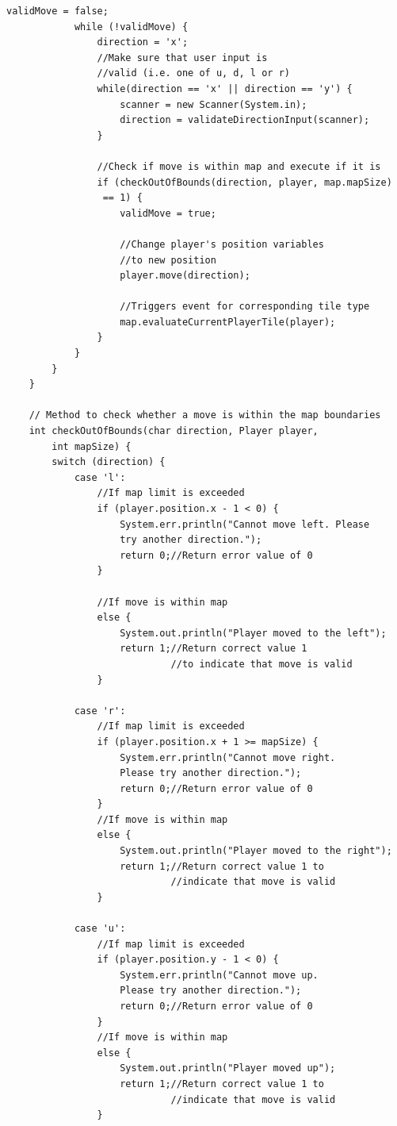 \documentclass[a4paper,12pt]{extarticle}
\begin{document}
\begin{lstlisting}[caption=The initial code of the Game class, label=amb]
            validMove = false;
            while (!validMove) {
                direction = 'x';
                //Make sure that user input is
                //valid (i.e. one of u, d, l or r)
                while(direction == 'x' || direction == 'y') {
                    scanner = new Scanner(System.in);
                    direction = validateDirectionInput(scanner);
                }

                //Check if move is within map and execute if it is
                if (checkOutOfBounds(direction, player, map.mapSize)
                 == 1) {
                    validMove = true;

                    //Change player's position variables 
                    //to new position
                    player.move(direction);

                    //Triggers event for corresponding tile type
                    map.evaluateCurrentPlayerTile(player);
                }
            }
        }
    }

    // Method to check whether a move is within the map boundaries
    int checkOutOfBounds(char direction, Player player, 
    	int mapSize) {
        switch (direction) {
            case 'l':
                //If map limit is exceeded
                if (player.position.x - 1 < 0) {
                    System.err.println("Cannot move left. Please 
                    try another direction.");
                    return 0;//Return error value of 0
                }

                //If move is within map
                else {
                    System.out.println("Player moved to the left");
                    return 1;//Return correct value 1
                    	     //to indicate that move is valid
                }

            case 'r':
                //If map limit is exceeded
                if (player.position.x + 1 >= mapSize) {
                    System.err.println("Cannot move right. 
                    Please try another direction.");
                    return 0;//Return error value of 0
                }
                //If move is within map
                else {
                    System.out.println("Player moved to the right");
                    return 1;//Return correct value 1 to 
                             //indicate that move is valid
                }

            case 'u':
                //If map limit is exceeded
                if (player.position.y - 1 < 0) {
                    System.err.println("Cannot move up. 
                    Please try another direction.");
                    return 0;//Return error value of 0
                }
                //If move is within map
                else {
                    System.out.println("Player moved up");
                    return 1;//Return correct value 1 to 
                             //indicate that move is valid
                }


\end{lstlisting}
\end{document}
